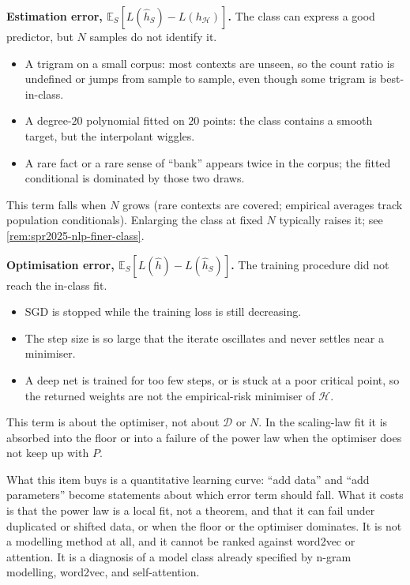 \documentclass[11pt,a4paper]{article}
\theoremstyle{definition}
\begin{document}
\begin{note}
\textbf{Estimation error, \(\mathbb{E}_S[L(\widehat h_S)-L(h_{\mathcal{H}})]\).} The class can express a good predictor, but \(N\) samples do not identify it.
\begin{itemize}
  \item A trigram on a small corpus: most contexts are unseen, so the count ratio is undefined or jumps from sample to sample, even though some trigram is best-in-class.
  \item A degree-\(20\) polynomial fitted on \(20\) points: the class contains a smooth target, but the interpolant wiggles.
  \item A rare fact or a rare sense of ``bank'' appears twice in the corpus; the fitted conditional is dominated by those two draws.
\end{itemize}
This term falls when \(N\) grows (rare contexts are covered; empirical averages track population conditionals). Enlarging the class at fixed \(N\) typically raises it; see \cref{rem:spr2025-nlp-finer-class}.

\textbf{Optimisation error, \(\mathbb{E}_S[L(\widehat h)-L(\widehat h_S)]\).} The training procedure did not reach the in-class fit.
\begin{itemize}
  \item SGD is stopped while the training loss is still decreasing.
  \item The step size is so large that the iterate oscillates and never settles near a minimiser.
  \item A deep net is trained for too few steps, or is stuck at a poor critical point, so the returned weights are not the empirical-risk minimiser of \(\mathcal{H}\).
\end{itemize}
This term is about the optimiser, not about \(\mathcal{D}\) or \(N\). In the scaling-law fit it is absorbed into the floor or into a failure of the power law when the optimiser does not keep up with \(P\).
\end{note}

What this item buys is a quantitative learning curve: ``add data'' and ``add parameters'' become statements about which error term should fall. What it costs is that the power law is a local fit, not a theorem, and that it can fail under duplicated or shifted data, or when the floor or the optimiser dominates. It is not a modelling method at all, and it cannot be ranked against word2vec or attention. It is a diagnosis of a model class already specified by n-gram modelling, word2vec, and self-attention.
\end{document}
